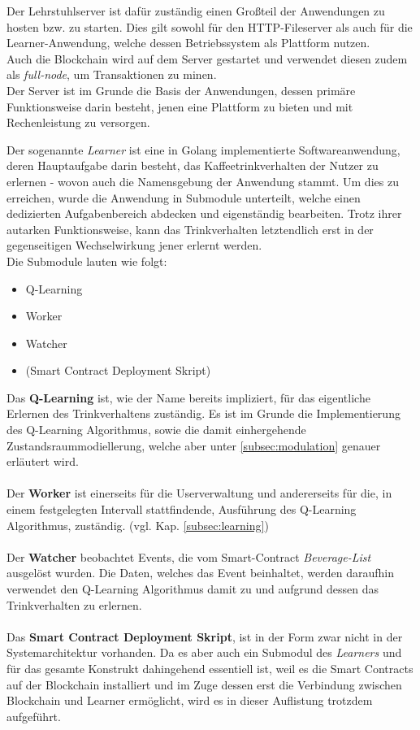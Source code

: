 Der Lehrstuhlserver ist dafür zuständig einen Großteil der Anwendungen zu hosten bzw. zu starten.
Dies gilt sowohl für den HTTP-Fileserver als auch für die Learner-Anwendung, welche dessen Betriebssystem als Plattform nutzen.\\
Auch die Blockchain wird auf dem Server gestartet und verwendet diesen zudem als \textit{full-node}, um Transaktionen zu minen.\\
Der Server ist im Grunde die Basis der Anwendungen, dessen primäre Funktionsweise darin besteht, jenen eine Plattform zu bieten und mit Rechenleistung zu versorgen.

Der sogenannte \textit{Learner} ist eine in Golang implementierte Softwareanwendung, deren Hauptaufgabe darin besteht, das Kaffeetrinkverhalten der Nutzer zu erlernen - wovon auch die Namensgebung der Anwendung stammt.
Um dies zu erreichen, wurde die Anwendung in Submodule unterteilt, welche einen dedizierten Aufgabenbereich abdecken und eigenständig bearbeiten.
Trotz ihrer autarken Funktionsweise, kann das Trinkverhalten letztendlich erst in der gegenseitigen Wechselwirkung jener erlernt werden. \\
Die Submodule lauten wie folgt:
\begin{itemize}
	\item Q-Learning
	\item Worker
	\item Watcher
	\item (Smart Contract Deployment Skript)
\end{itemize}

Das \textbf{Q-Learning} ist, wie der Name bereits impliziert, für das eigentliche Erlernen des Trinkverhaltens zuständig. Es ist im Grunde die Implementierung des Q-Learning Algorithmus, sowie die damit einhergehende Zustandsraummodiellerung, welche aber unter \ref{subsec:modulation} genauer erläutert wird.
\\\\
Der \textbf{Worker} ist einerseits für die Userverwaltung und andererseits für die, in einem festgelegten Intervall stattfindende, Ausführung des Q-Learning Algorithmus, zuständig. (vgl. Kap. \ref{subsec:learning})
\\\\
Der \textbf{Watcher} beobachtet Events, die vom Smart-Contract \textit{Beverage-List} ausgelöst wurden. Die Daten, welches das Event beinhaltet, werden daraufhin verwendet den Q-Learning Algorithmus damit zu  und aufgrund dessen das Trinkverhalten zu erlernen.
\\\\
Das \textbf{Smart Contract Deployment Skript}, ist in der Form zwar nicht in der Systemarchitektur vorhanden. Da es aber auch ein Submodul des \textit{Learners} und für das gesamte Konstrukt dahingehend essentiell ist, weil es die Smart Contracts auf der Blockchain installiert und im Zuge dessen erst die Verbindung zwischen Blockchain und Learner ermöglicht, wird es in dieser Auflistung trotzdem aufgeführt.

